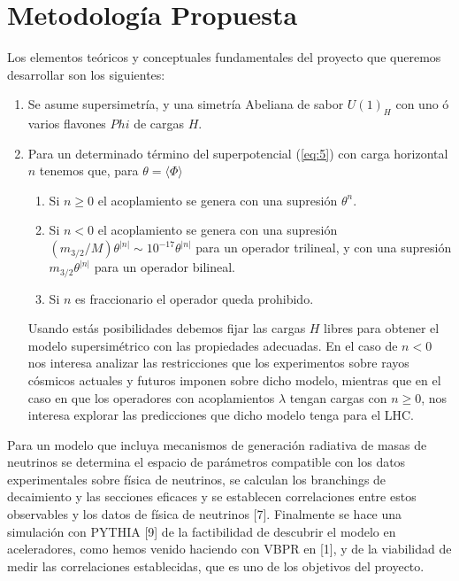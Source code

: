 \section{ Metodología Propuesta }

Los elementos teóricos y conceptuales fundamentales del proyecto que queremos desarrollar
son los siguientes:

\begin{enumerate}
\item Se asume supersimetría, y una simetría Abeliana de sabor $U(1)_H$ con uno ó varios flavones $Phi$ de cargas $H$.

\item Para un determinado término del superpotencial (\ref{eq:5}) con carga horizontal $n$ tenemos que, para $\theta=\langle\Phi\rangle$
  \begin{enumerate}
  \item Si $n\ge 0$ el acoplamiento se genera con una supresión $\theta^n$.
  \item Si $n<0$ el acoplamiento se genera con una supresión $(m_{3/2}/M)\theta^{|n|}\sim 10^{-17}\theta^{|n|}$ para un operador trilineal, y con una supresión $m_{3/2}\theta^{|n|}$ para un operador bilineal.
  \item Si $n$ es fraccionario el operador queda prohibido.
  \end{enumerate}
Usando estás posibilidades debemos fijar las cargas $H$ libres para obtener el modelo supersimétrico con las propiedades adecuadas. %
En el caso de $n<0$ nos interesa analizar las restricciones que los experimentos sobre rayos cósmicos actuales y futuros imponen sobre dicho modelo, mientras que en el caso en que los operadores con acoplamientos $\lambda$ tengan cargas con $n\ge 0$, nos interesa explorar las predicciones que dicho modelo tenga para el LHC.
\end{enumerate}

Para un modelo que incluya mecanismos de generación radiativa de masas de neutrinos se determina el espacio de parámetros compatible con los datos experimentales sobre física de neutrinos, se calculan los branchings de decaimiento y las secciones eficaces y se establecen correlaciones entre estos observables y los datos de física de neutrinos [7]. Finalmente se hace una simulación con PYTHIA [9] de la factibilidad de descubrir el modelo en aceleradores, como hemos venido haciendo con VBPR en [1], y de la viabilidad de medir las correlaciones establecidas, que es uno de los objetivos del proyecto.

